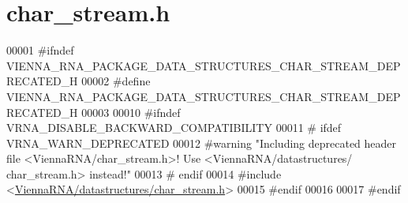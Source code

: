 \hypertarget{char__stream_8h_source}{}\section{char\+\_\+stream.\+h}
\label{char__stream_8h_source}

\begin{DoxyCode}
00001 \textcolor{preprocessor}{#ifndef VIENNA\_RNA\_PACKAGE\_DATA\_STRUCTURES\_CHAR\_STREAM\_DEPRECATED\_H}
00002 \textcolor{preprocessor}{#define VIENNA\_RNA\_PACKAGE\_DATA\_STRUCTURES\_CHAR\_STREAM\_DEPRECATED\_H}
00003 
00010 \textcolor{preprocessor}{#ifndef VRNA\_DISABLE\_BACKWARD\_COMPATIBILITY}
00011 \textcolor{preprocessor}{# ifdef VRNA\_WARN\_DEPRECATED}
00012 \textcolor{preprocessor}{#warning "Including deprecated header file <ViennaRNA/char\_stream.h>! Use <ViennaRNA/datastructures/
      char\_stream.h> instead!"}
00013 \textcolor{preprocessor}{# endif}
00014 \textcolor{preprocessor}{#include <\hyperlink{datastructures_2char__stream_8h}{ViennaRNA/datastructures/char\_stream.h}>}
00015 \textcolor{preprocessor}{#endif}
00016 
00017 \textcolor{preprocessor}{#endif}
\end{DoxyCode}
